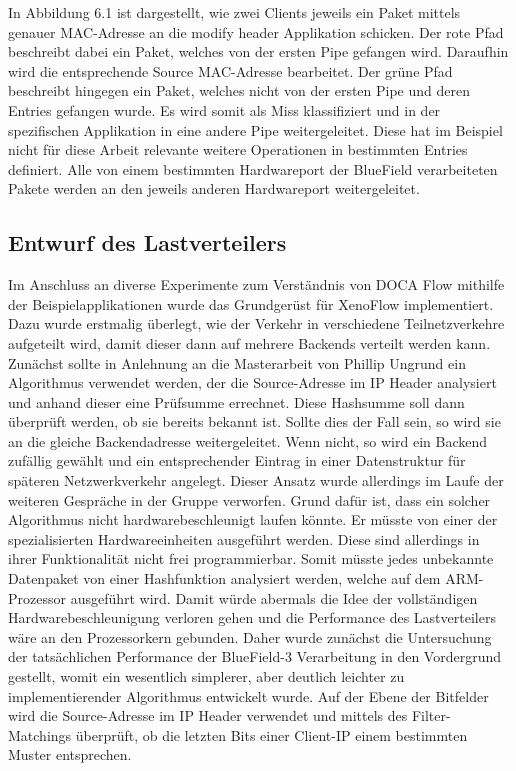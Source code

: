 In Abbildung 6.1 ist dargestellt, wie zwei Clients jeweils ein Paket mittels genauer MAC-Adresse an die modify header Applikation schicken. Der rote Pfad beschreibt dabei ein Paket, welches von der ersten Pipe gefangen wird. Daraufhin wird die entsprechende Source MAC-Adresse bearbeitet. Der grüne Pfad beschreibt hingegen ein Paket, welches nicht von der ersten Pipe und deren Entries gefangen wurde. Es wird somit als Miss klassifiziert und in der spezifischen Applikation in eine andere Pipe weitergeleitet. Diese hat im Beispiel nicht für diese Arbeit relevante weitere Operationen in bestimmten Entries definiert. Alle von einem bestimmten Hardwareport der BlueField verarbeiteten Pakete werden an den jeweils anderen Hardwareport weitergeleitet.
\subsection{Entwurf des Lastverteilers}
Im Anschluss an diverse Experimente zum Verständnis von DOCA Flow mithilfe der Beispielapplikationen wurde das Grundgerüst für XenoFlow implementiert. Dazu wurde erstmalig überlegt, wie der Verkehr in verschiedene Teilnetzverkehre aufgeteilt wird, damit dieser dann auf mehrere Backends verteilt werden kann. Zunächst sollte in Anlehnung an die Masterarbeit von Phillip Ungrund ein Algorithmus verwendet werden, der die Source-Adresse im IP Header analysiert und anhand dieser eine Prüfsumme errechnet. Diese Hashsumme soll dann überprüft werden, ob sie bereits bekannt ist. Sollte dies der Fall sein, so wird sie an die gleiche Backendadresse weitergeleitet. Wenn nicht, so wird ein Backend zufällig gewählt und ein entsprechender Eintrag in einer Datenstruktur für späteren Netzwerkverkehr angelegt. Dieser Ansatz wurde allerdings im Laufe der weiteren Gespräche in der Gruppe verworfen. Grund dafür ist, dass ein solcher Algorithmus nicht hardwarebeschleunigt laufen könnte. Er müsste von einer der spezialisierten Hardwareeinheiten ausgeführt werden. Diese sind allerdings in ihrer Funktionalität nicht frei programmierbar. Somit müsste jedes unbekannte Datenpaket von einer Hashfunktion analysiert werden, welche auf dem ARM-Prozessor ausgeführt wird. Damit würde abermals die Idee der vollständigen Hardwarebeschleunigung verloren gehen und die Performance des Lastverteilers wäre an den Prozessorkern gebunden. Daher wurde zunächst die Untersuchung der tatsächlichen Performance der BlueField-3 Verarbeitung in den Vordergrund gestellt, womit ein wesentlich simplerer, aber deutlich leichter zu implementierender Algorithmus entwickelt wurde. Auf der Ebene der Bitfelder wird die Source-Adresse im IP Header verwendet und mittels des Filter-Matchings überprüft, ob die letzten Bits einer Client-IP einem bestimmten Muster entsprechen.
